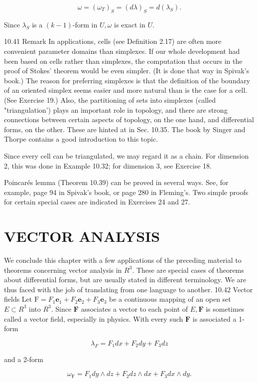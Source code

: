\documentclass[10pt]{article}
\begin{document}
$$
\omega=\left(\omega_{T}\right)_{S}=(d \lambda)_{S}=d\left(\lambda_{S}\right) .
$$

Since $\lambda_{S}$ is a $(k-1)$-form in $U, \omega$ is exact in $U$.

10.41 Remark In applications, cells (see Definition 2.17) are often more convenient parameter domains than simplexes. If our whole development had been based on cells rather than simplexes, the computation that occurs in the proof of Stokes' theorem would be even simpler. (It is done that way in Spivak's book.) The reason for preferring simplexes is that the definition of the boundary of an oriented simplex seems easier and more natural than is the case for a cell. (See Exercise 19.) Also, the partitioning of sets into simplexes (called "triangulation') plays an important role in topology, and there are strong connections between certain aspects of topology, on the one hand, and differential forms, on the other. These are hinted at in Sec. 10.35. The book by Singer and Thorpe contains a good introduction to this topic.

Since every cell can be triangulated, we may regard it as a chain. For dimension 2, this was done in Example 10.32; for dimension 3, see Exercise 18.

Poincarés lemma (Theorem 10.39) can be proved in several ways. See, for example, page 94 in Spivak's book, or page 280 in Fleming's. Two simple proofs for certain special cases are indicated in Exercises 24 and 27.

\section{VECTOR ANALYSIS}
We conclude this chapter with a few applications of the preceding material to theorems concerning vector analysis in $R^{3}$. These are special cases of theorems about differential forms, but are usually stated in different terminology. We are thus faced with the job of translating from one language to another. 10.42 Vector fields Let $\mathrm{F}=F_{1} \mathbf{e}_{1}+F_{2} \mathbf{e}_{2}+F_{3} \mathbf{e}_{3}$ be a continuous mapping of an open set $E \subset R^{3}$ into $R^{3}$. Since $\mathbf{F}$ associates a vector to each point of $E, \mathbf{F}$ is sometimes called a vector field, especially in physics. With every such $\mathbf{F}$ is associated a 1-form

$$
\lambda_{F}=F_{1} d x+F_{2} d y+F_{3} d z
$$

and a 2-form

$$
\omega_{\mathrm{F}}=F_{1} d y \wedge d z+F_{2} d z \wedge d x+F_{3} d x \wedge d y .
$$
\end{document}
